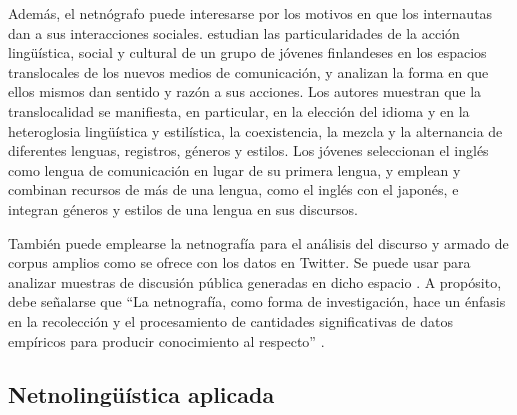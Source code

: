Además, el netnógrafo puede interesarse por los motivos en que los
internautas dan a sus interacciones sociales. \textcite{leppanen2009} estudian las particularidades de la acción lingüística, social y
cultural de un grupo de jóvenes finlandeses en los espacios translocales
de los nuevos medios de comunicación, y analizan la forma en que ellos
mismos dan sentido y razón a sus acciones. Los autores muestran que la
translocalidad se manifiesta, en particular, en la elección del idioma y
en la heteroglosia lingüística y estilística, la coexistencia, la mezcla
y la alternancia de diferentes lenguas, registros, géneros y estilos.
Los jóvenes seleccionan el inglés como lengua de comunicación en lugar
de su primera lengua, y emplean y combinan recursos de más de una
lengua, como el inglés con el japonés, e integran géneros y estilos de
una lengua en sus discursos.

También puede emplearse la netnografía para el análisis del discurso y
armado de corpus amplios como se ofrece con los datos en Twitter. Se
puede usar para analizar muestras de discusión pública generadas en
dicho espacio \cite{Bonilla_2022}. A propósito, debe señalarse que ``La
netnografía, como forma de investigación, hace un énfasis en la
recolección y el procesamiento de cantidades significativas de datos
empíricos para producir conocimiento al respecto'' \cite[p. 7]{Bonilla_2022}.

\subsection{Netnolingüística aplicada} \label{sub-sec-netnolingüísticaaplicada}

